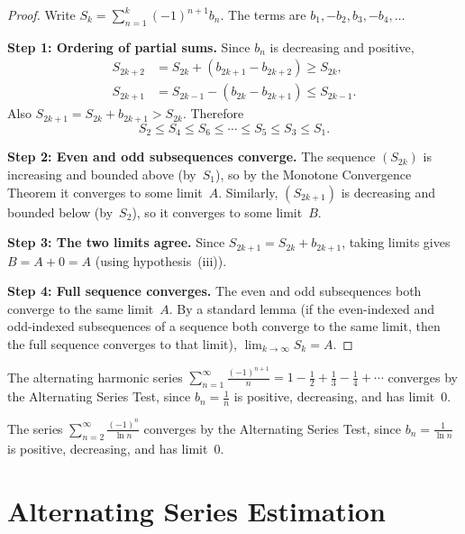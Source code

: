 \begin{proof}
Write $S_{k}=\sum_{n=1}^{k}(-1)^{n+1}b_{n}$.  The terms are $b_{1},-b_{2},b_{3},-b_{4},\ldots$

\textbf{Step 1: Ordering of partial sums.}  Since $b_{n}$ is decreasing and positive,
\begin{align*}
  S_{2k+2} &= S_{2k} + (b_{2k+1}-b_{2k+2}) \ge S_{2k}, \\
  S_{2k+1} &= S_{2k-1} - (b_{2k}-b_{2k+1}) \le S_{2k-1}.
\end{align*}
Also $S_{2k+1}=S_{2k}+b_{2k+1}>S_{2k}$.  Therefore
\[
  S_{2}\le S_{4}\le S_{6} \le \cdots \le S_{5} \le S_{3} \le S_{1}.
\]

\textbf{Step 2: Even and odd subsequences converge.}  The sequence $(S_{2k})$ is increasing and bounded above (by~$S_{1}$), so by the Monotone Convergence Theorem it converges to some limit~$A$.  Similarly, $(S_{2k+1})$ is decreasing and bounded below (by~$S_{2}$), so it converges to some limit~$B$.

\textbf{Step 3: The two limits agree.}  Since $S_{2k+1}=S_{2k}+b_{2k+1}$, taking limits gives $B = A + 0 = A$ (using hypothesis~(iii)).

\textbf{Step 4: Full sequence converges.}  The even and odd subsequences both converge to the same limit~$A$.  By a standard lemma (if the even-indexed and odd-indexed subsequences of a sequence both converge to the same limit, then the full sequence converges to that limit), $\lim_{k\to\infty}S_{k}=A$.
\end{proof}

\begin{example}
\label{ex:13-10}
The alternating harmonic series $\displaystyle\sum_{n=1}^{\infty}\frac{(-1)^{n+1}}{n} = 1-\frac{1}{2}+\frac{1}{3}-\frac{1}{4}+\cdots$ converges by the Alternating Series Test, since $b_{n}=\frac{1}{n}$ is positive, decreasing, and has limit~$0$.
\end{example}

\begin{example}
\label{ex:13-11}
The series $\displaystyle\sum_{n=2}^{\infty}\frac{(-1)^{n}}{\ln n}$ converges by the Alternating Series Test, since $b_{n}=\frac{1}{\ln n}$ is positive, decreasing, and has limit~$0$.
\end{example}

\section{Alternating Series Estimation}
\label{sec:13.14}

